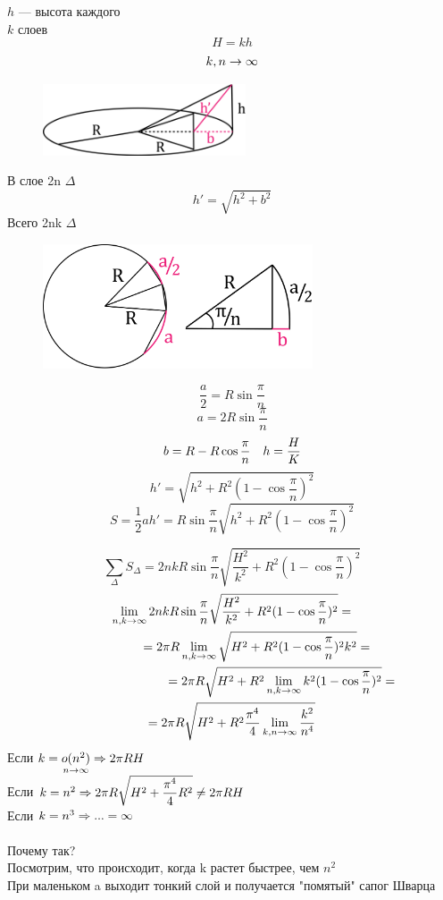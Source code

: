 \documentclass[main]{subfiles}
\begin{document}
\begin{example}[контрпример]
		$h$ --- высота каждого\\
		$k$ слоев
		\[H = k h\]
		\[k,n \rightarrow \infty\]
		\begin{figure}[H]
			\centering
			\includegraphics[width=6cm]{pics/7_3.png}
		\end{figure}
		В слое 2n $\Delta$
		\[h'=\sqrt{h^2 + b^2}\]
		Всего 2nk $\Delta$
		\begin{figure}[H]
			\centering
			\includegraphics[width=8cm]{pics/7_4.png}
		\end{figure}
		\[\dfrac{a}{2} = R \sin \dfrac{\pi}{n}\]
		\[a = 2 R \sin \dfrac{\pi}{n}\]
		\[b = R - R \cos \dfrac{\pi}{n} \quad h = \dfrac{H}{K}\]
		\[h' = \sqrt{h^2 + R^2 (1-\cos \dfrac{\pi}{n})^2}\]
		\[S = \dfrac{1}{2} a h' = R \sin \dfrac{\pi}{n} \sqrt{h^2 + R^2 (1-\cos \dfrac{\pi}{n})^2}\]

		\[\sum_{\Delta} S_{\Delta} = 2nk R \sin \dfrac{\pi}{n} \sqrt{\dfrac{H^2}{k^2} + R^2 (1-\cos \dfrac{\pi}{n})^2}\]
		\begin{multline*}
			\lim_{n,k \rightarrow \infty} 2nk R \sin \dfrac{\pi}{n} \sqrt{\dfrac{H^2}{k^2} + R^2 (1-\cos \dfrac{\pi}{n})^2} = \\
			\qquad \qquad = 2 \pi R \lim_{n,k \rightarrow \infty} \sqrt{H^2 + R^2 (1-\cos \dfrac{\pi}{n})^2 k^2} = \\
			\qquad \qquad \qquad \qquad = 2 \pi R \sqrt{H^2 + R^2 \lim_{n,k \rightarrow \infty} k^2 (1-\cos \dfrac{\pi}{n})^2} = \\
			= 2\pi R \sqrt{H^2 + R^2 \dfrac{\pi^4}{4} \lim_{k,n \rightarrow \infty} \dfrac{k^2}{n^4}}
		\end{multline*}
		Если $k=\underset{n \rightarrow \infty}{o(n^2)} \Rightarrow 2\pi RH$\\
		Если $k = n^2 \Rightarrow 2 \pi R \sqrt{H^2 + \dfrac{\pi^4}{4} R^2} \neq 2\pi R H$\\
		Если $k = n^3 \Rightarrow ... = \infty$\\ \\
		Почему так? \\
		Посмотрим, что происходит, когда k растет быстрее, чем $n^2$\\
		При маленьком a выходит тонкий слой и получается "помятый"{} сапог Шварца
	\end{example}
\end{document}
